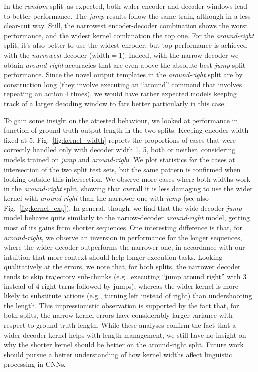 In the \emph{random} split, as expected, both wider encoder and
decoder windows lead to better performance. The \emph{jump} results
follow the same train, although in a less clear-cut way. Still, the
narrowest encoder-decoder combination shows the worst performance, and
the widest kernel combination the top one. For the
\emph{around-right} split, it's also better to use the widest encoder,
but top performance is achieved with the \emph{narrowest} decoder
(width$=$1). Indeed, with the narrow decoder we obtain
\emph{around-right} accuracies that are even above the absolute-best
\emph{jump}-split performance. Since the novel output templates in the
\emph{around-right} split are by construction long (they involve
executing an ``around'' command that involves repeating an action 4
times), we would have rather expected models keeping track of a larger
decoding window to fare better particularly in this case.

To gain some insight on the attested behaviour, we looked at
performance in function of ground-truth output length in the two
splits. Keeping encoder width fixed at 5, Fig.~\ref{fig:kernel_width}
reports the proportions of cases that were correctly handled only with
decoder width 1, 5, both or neither, considering models trained on
\emph{jump} and \emph{around-right}. We plot statistics for the cases
at intersection of the two split test sets, but the same pattern is
confirmed when looking outside this intersection. We observe more
cases where both widths work in the \emph{around-right} split, showing
that overall it is less damaging to use the wider kernel with
\emph{around-right} than the narrower one with \emph{jump} (see also
Fig.~\ref{fig:kernel_exp}). In general, though, we find that the
wide-decoder \emph{jump} model behaves quite similarly to the
narrow-decoder \emph{around-right} model, getting most of its gains
from shorter sequences. One interesting difference is that, for
\emph{around-right}, we observe an inversion in performance for the
longer sequences, where the wider decoder outperforms the narrower
one, in accordance with our intuition that more context should help
longer execution tasks. Looking qualitatively at the errors, we note
that, for both splits, the narrower decoder tends to skip trajectory
sub-chunks (e.g., executing ``jump around right'' with 3 instead of 4
right turns followed by jumps), whereas the wider kernel is more
likely to substitute actions (e.g., turning left instead of right)
than undershooting the length. This impressionistic observation is
supported by the fact that, for both splits, the narrow-kernel errors
have considerably larger variance with respect to ground-truth
length. While these analyses confirm the fact that a wider decoder
kernel helps with length management, we still have no insight on why
the shorter kernel should be better on the around-right split. Future
work should pursue a better understanding of how kernel widths affect
linguistic processing in CNNs.

